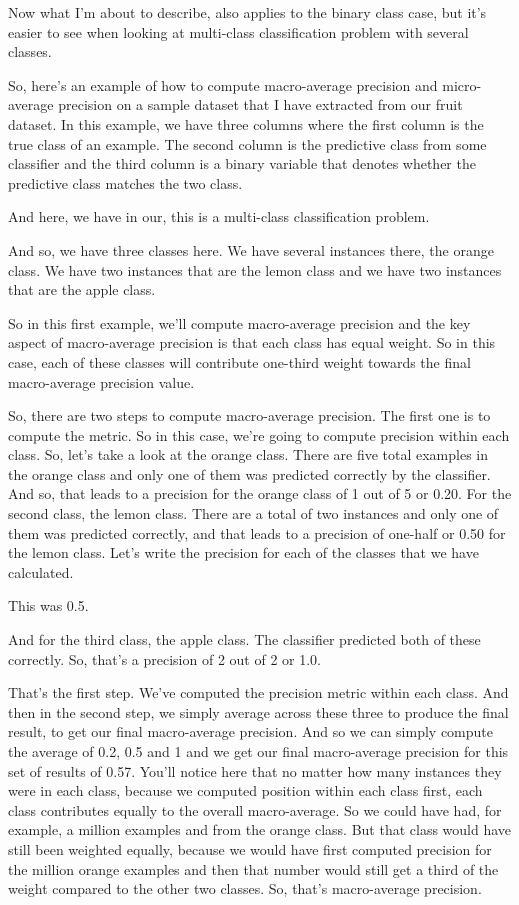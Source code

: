 \begin{multicols}{2}
Now what I'm about to describe, also applies to the binary class case, but it's easier to see when looking at multi-class classification problem with several classes. 

So, here's an example of how to compute macro-average precision and micro-average precision on a sample dataset that I have extracted from our fruit dataset. In this example, we have three columns where the first column is the true class of an example. The second column is the predictive class from some classifier and the third column is a binary variable that denotes whether the predictive class matches the two class. 

And here, we have in our, this is a multi-class classification problem. 

And so, we have three classes here. We have several instances there, the orange class. We have two instances that are the lemon class and we have two instances that are the apple class. 

So in this first example, we'll compute macro-average precision and the key aspect of macro-average precision is that each class has equal weight. So in this case, each of these classes will contribute one-third weight towards the final macro-average precision value. 

So, there are two steps to compute macro-average precision. The first one is to compute the metric. So in this case, we're going to compute precision within each class. So, let's take a look at the orange class. There are five total examples in the orange class and only one of them was predicted correctly by the classifier. And so, that leads to a precision for the orange class of 1 out of 5 or 0.20. For the second class, the lemon class. There are a total of two instances and only one of them was predicted correctly, and that leads to a precision of one-half or 0.50 for the lemon class. Let's write the precision for each of the classes that we have calculated. 


This was 0.5. 

And for the third class, the apple class. The classifier predicted both of these correctly. So, that's a precision of 2 out of 2 or 1.0. 

That's the first step. We've computed the precision metric within each class. And then in the second step, we simply average across these three to produce the final result, to get our final macro-average precision. And so we can simply compute the average of 0.2, 0.5 and 1 and we get our final macro-average precision for this set of results of 0.57. You'll notice here that no matter how many instances they were in each class, because we computed position within each class first, each class contributes equally to the overall macro-average. So we could have had, for example, a million examples and from the orange class. But that class would have still been weighted equally, because we would have first computed precision for the million orange examples and then that number would still get a third of the weight compared to the other two classes. So, that's macro-average precision. 


\end{multicols}
